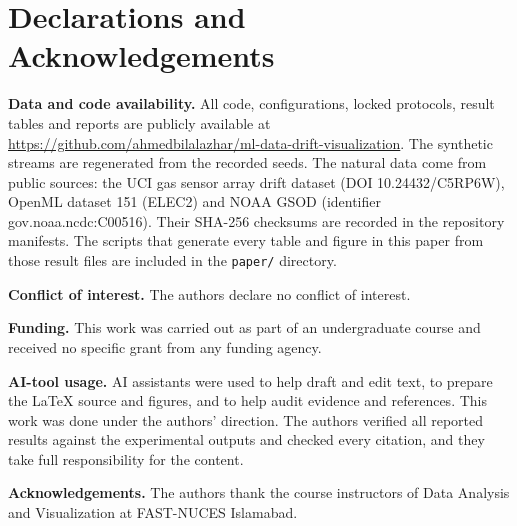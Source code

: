 \section*{Declarations and Acknowledgements}
\label{sec:decl}

\textbf{Data and code availability.} All code, configurations, locked protocols, result
tables and reports are publicly available at
\url{https://github.com/ahmedbilalazhar/ml-data-drift-visualization}. The synthetic
streams are regenerated from the recorded seeds. The natural data come from public
sources: the UCI gas sensor array drift dataset (DOI 10.24432/C5RP6W), OpenML dataset
151 (ELEC2) and NOAA GSOD (identifier gov.noaa.ncdc:C00516). Their SHA-256 checksums
are recorded in the repository manifests. The scripts that generate every table and
figure in this paper from those result files are included in the \texttt{paper/}
directory.

\textbf{Conflict of interest.} The authors declare no conflict of interest.

\textbf{Funding.} This work was carried out as part of an undergraduate course and received no specific grant from any funding agency.

\textbf{AI-tool usage.} AI assistants were used to help draft and edit text, to
prepare the \LaTeX{} source and figures, and to help audit evidence and references.
This work was done under the authors' direction. The authors verified all reported
results against the experimental outputs and checked every citation, and they take
full responsibility for the content.

\textbf{Acknowledgements.} The authors thank the course instructors of Data Analysis and
Visualization at FAST-NUCES Islamabad.
